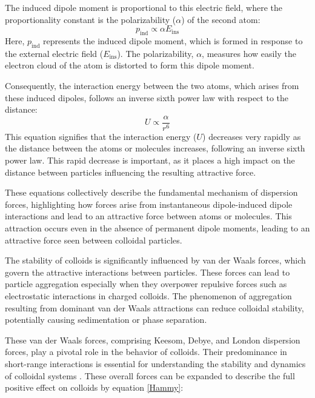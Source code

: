 The induced dipole moment is proportional to this electric field, where the proportionality constant is the polarizability (\(\alpha\)) of the second atom:
\begin{equation}
p_{\text{ind}} \propto \alpha E_{\text{ins}}
\end{equation}
Here, \(p_{\text{ind}}\) represents the induced dipole moment, which is formed in response to the external electric field (\(E_{\text{ins}}\)). The polarizability, \(\alpha\), measures how easily the electron cloud of the atom is distorted to form this dipole moment.

Consequently, the interaction energy between the two atoms, which arises from these induced dipoles, follows an inverse sixth power law with respect to the distance:
\begin{equation}
U \propto \frac{\alpha}{r^6}
\end{equation}
This equation signifies that the interaction energy (\(U\)) decreases very rapidly as the distance between the atoms or molecules increases, following an inverse sixth power law. This rapid decrease is important, as it places a high impact on the distance between particles influencing the resulting attractive force.

These equations collectively describe the fundamental mechanism of dispersion forces, highlighting how forces arise from instantaneous dipole-induced dipole interactions and lead to an attractive force between atoms or molecules. This attraction occurs even in the absence of permanent dipole moments, leading to an attractive force seen between colloidal particles.

The stability of colloids is significantly influenced by van der Waals forces, which govern the attractive interactions between particles. These forces can lead to particle aggregation especially when they overpower repulsive forces such as electrostatic interactions in charged colloids. The phenomenon of aggregation resulting from dominant van der Waals attractions can reduce colloidal stability, potentially causing sedimentation or phase separation. 

These van der Waals forces, comprising Keesom, Debye, and London dispersion forces, play a pivotal role in the behavior of colloids. Their predominance in short-range interactions is essential for understanding the stability and dynamics of colloidal systems \cite{colloid_review1}\cite{lilBlueBook}\cite{IsGreenBook}\cite{FoundColloidBook}. These overall forces can be expanded to describe the full positive effect on colloids by equation \ref{Hammy}: 


